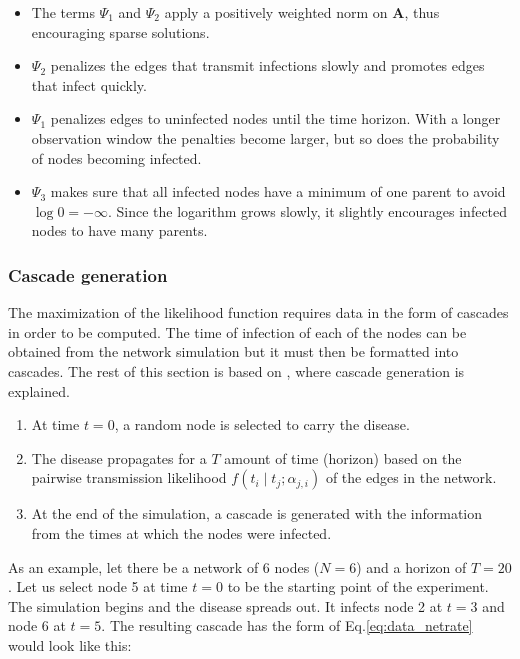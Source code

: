 \documentclass[11pt]{article}
\begin{document}
\begin{itemize}
\item The terms $\Psi_{1}$ and $\Psi_{2}$ apply a positively weighted norm on $\textbf{A}$, thus encouraging sparse solutions.
\item $\Psi_{2}$ penalizes the edges that transmit infections slowly and promotes edges that infect quickly.
\item $\Psi_{1}$ penalizes edges to uninfected nodes until the time horizon. With a longer observation window the penalties become larger, but so does the probability of nodes becoming infected.
\item $\Psi_{3}$ makes sure that all infected nodes have a minimum of one parent to avoid $\log 0 = -\infty$. Since the logarithm grows slowly, it slightly encourages infected nodes to have many parents.
\end{itemize}

\subsubsection{Cascade generation}\label{sec:cascade_generation}

The maximization of the likelihood function requires data in the form of cascades in order to be computed. The time of infection of each of the nodes can be obtained from the network simulation but it must then be formatted into cascades. The rest of this section is based on \cite{pranav_report}, where cascade generation is explained. 

\begin{enumerate}
\item At time $t=0$, a random node is selected to carry the disease.
\item The disease propagates for a $T$ amount of time (horizon) based on the pairwise transmission likelihood $f(t_{i}\mid t_{j};\alpha_{j,i})$ of the edges in the network.
\item At the end of the simulation, a cascade is generated with the information from the times at which the nodes were infected. 
\end{enumerate}

As an example, let there be a network of 6 nodes ($N=6$) and a horizon of $T=20$. Let us select node 5 at time $t=0$ to be the starting point of the experiment. The simulation begins and the disease spreads out. It infects node 2 at $t=3$ and node 6 at $t=5$. The resulting cascade has the form of Eq.\ref{eq:data_netrate}  would look like this:
\end{document}

